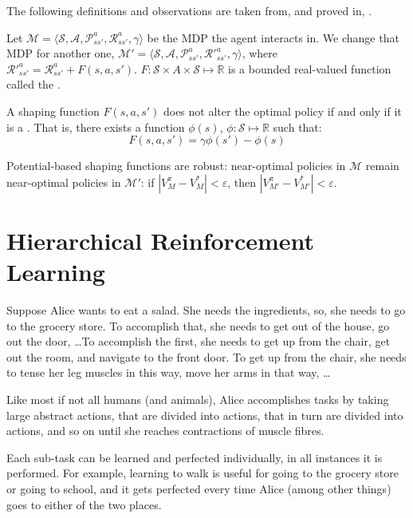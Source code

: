 The following definitions and observations are taken from, and proved in,
\citet{ng1999policy}.

Let $\mathcal{M} = \langle \mathcal{S}, \mathcal{A},
\mathcal{P}^a_{ss'}, \mathcal{R}^a_{ss'}, \gamma \rangle$ be the \ac{MDP} the
agent interacts in. We change that \ac{MDP} for another one, $\mathcal{M}' = \langle
\mathcal{S}, \mathcal{A}, \mathcal{P}^a_{ss'}, \mathcal{R}'^a_{ss'}, \gamma
\rangle$, where $\mathcal{R}'^a_{ss'} = \mathcal{R}^a_{ss'} + F(s, a, s')$.
$F : \mathcal{S} \times A \times \mathcal{S} \mapsto \mathbb{R}$ is a bounded
real-valued function called the .

A shaping function $F(s, a, s')$ does not alter the optimal policy if and only
if it is a . That is, there exists a
function $\phi(s)$, $\phi : \mathcal{S} \mapsto \mathbb{R}$ such that:
\begin{equation}
  F(s, a, s') = \gamma \phi(s') - \phi(s)
  \label{eq:shaping-reward}
\end{equation}

Potential-based shaping functions are robust: near-optimal policies
in $\mathcal{M}$ remain near-optimal policies in $\mathcal{M'}$: if $\left|
V^\pi_M - V^*_M \right| < \varepsilon$, then $\left| V^\pi_{M'} - V^*_{M'}
\right| < \varepsilon$.

\section{Hierarchical Reinforcement Learning\label{sec:hierarchical-rl}}

Suppose Alice wants to eat a salad. She needs the ingredients, so, she needs to
go to the grocery store. To accomplish that, she needs to get out of the house,
go out the door, \dots To accomplish the first, she needs to get up from the
chair, get out the room, and navigate to the front door. To get up from the
chair, she needs to tense her leg muscles in this way, move her arms in that
way, \dots

Like most if not all humans (and animals), Alice accomplishes tasks by taking
large abstract actions, that are divided into actions, that in turn are divided
into actions, and so on until she reaches contractions of muscle fibres.

Each sub-task can be learned and perfected individually, in all instances it is
performed. For example, learning to walk is useful for going to the grocery
store or going to school, and it gets perfected every time Alice (among other
things) goes to either of the two places.

